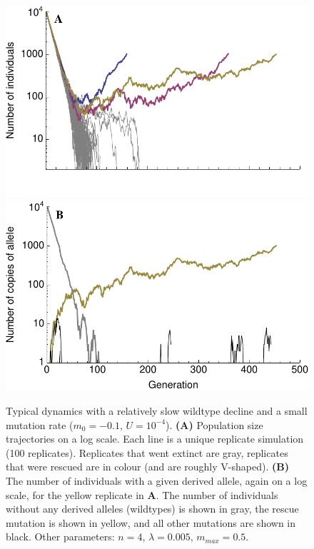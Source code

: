 \documentclass[9pt,twocolumn,twoside,lineno]{gsajnl}
\begin{document}
\begin{figure}[!h]
\centering
\includegraphics[width=\linewidth]{../IMAGES/Vshape.pdf}\\
\includegraphics[width=\linewidth]{../IMAGES/VshapeMutations.pdf}
\caption{
Typical dynamics with a relatively slow wildtype decline and a small mutation rate ($m_0 = -0.1$, $U=10^{-4}$).
\textbf{(A)} Population size trajectories on a log scale.
Each line is a unique replicate simulation (100 replicates).
Replicates that went extinct are gray, replicates that were rescued are in colour (and are roughly V-shaped). 
\textbf{(B)} The number of individuals with a given derived allele, again on a log scale, for the yellow replicate in \textbf{A}.
The number of individuals without any derived alleles (wildtypes) is shown in gray, the rescue mutation is shown in yellow, and all other mutations are shown in black.
Other parameters: $n=4$, $\lambda=0.005$, $m_{max}=0.5$.
}%
\label{fig:Vshape}
\end{figure}
\end{document}
